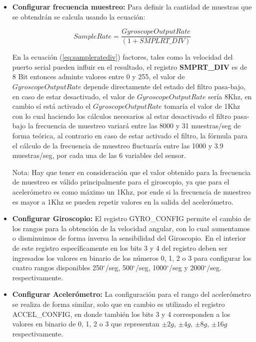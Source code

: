 \documentclass[12pt,a4paper]{article}
\newcommand{\grad}{$^{\circ}$}
\begin{document}
\begin{itemize}
	\item \textbf{Configurar frecuencia muestreo:} Para definir la cantidad de muestras que se obtendrán se calcula usando la ecuación: 
	
	\begin{equation} 
	\label{eq:sampleratediv}
	Sample Rate = \frac{Gyroscope Output Rate}{(1 + SMPLRT\_DIV) }
	\end{equation}
	
	En la ecuación (\ref{eq:sampleratediv}) factores, tales como la velocidad del puerto serial pueden influir en el resultado, el registro \textbf{SMPRT\_DIV} es de 8 Bit entonces adminte valores entre 0 y 255, el valor de $Gyroscope Output Rate$ depende directamente del estado del filtro pasa-bajo, en caso de estar desactivado, el valor de $Gyroscope Output Rate$ sería 8Khz, en cambio sí está activado el $Gyroscope Output Rate$ tomaría el valor de 1Khz con lo cual haciendo los cálculos necesarios al estar desactivado el filtro pasa-bajo la frecuencia de muestreo variará entre las 8000 y 31 muestras/seg de forma teórica, al contrario en caso de estar activado el filtro, la fórmula para el cálculo de la frecuencia de muestreo fluctuaría entre las 1000 y 3.9 muestras/seg, por cada una de las 6 variables del sensor.
	
	Nota: Hay que tener en consideración que el valor obtenido para la frecuencia de muestreo es válido principalmente para el giroscopio, ya que para el acelerómetro es como máximo un 1Khz, por ende si la frecuencia de muestreo es mayor a 1Khz se pueden repetir valores en la salida del acelerómetro.
	
	\item \textbf{Configurar Giroscopio:} El registro GYRO\_CONFIG permite el cambio de los rangos para la obtención de la velocidad angular, con lo cual aumentamos o disminuimos de forma inversa la sensibilidad del Giroscopio. En el interior de este registro específicamente en los bits 3 y 4 del registro deben ser ingresados los valores en binario de los números 0, 1, 2 o 3 para configurar los cuatro rangos disponibles 250\grad/seg, 500\grad/seg, 1000\grad/seg y 2000\grad/seg. respectivamente.
	
	\item \textbf{Configurar Acelerómetro:} La configuración para el rango del acelerómetro se realiza de forma similar, solo que en cambio es utilizado el registro ACCEL\_CONFIG, en donde también los bits 3 y 4 corresponden a los valores en binario de 0, 1, 2 o 3 que representan $\pm 2g$, $\pm 4g$, $\pm 8g$, $\pm 16g$ respectivamente.
	
\end{itemize}
\end{document}

